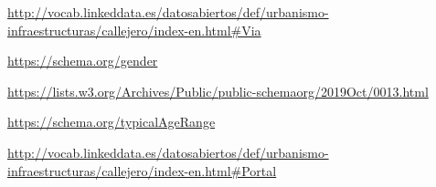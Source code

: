 \begin{thebibliography}{99}
\url{http://vocab.linkeddata.es/datosabiertos/def/urbanismo-infraestructuras/callejero/index-en.html#Via}

\url{https://schema.org/gender}

\url{https://lists.w3.org/Archives/Public/public-schemaorg/2019Oct/0013.html}

\url{https://schema.org/typicalAgeRange}


\url{http://vocab.linkeddata.es/datosabiertos/def/urbanismo-infraestructuras/callejero/index-en.html#Portal}










\end{thebibliography}
